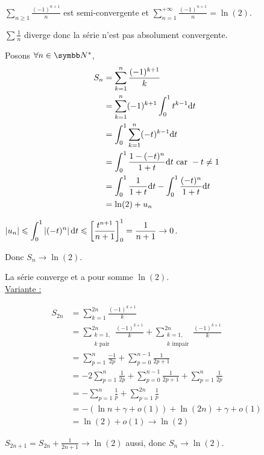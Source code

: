\begin{exemple}
    $\displaystyle \sum_{n \geqslant 1 } \frac{(-1)^{n + 1}} n $ est semi-convergente et $\displaystyle \sum_{n = 1 }^{+ \infty} \frac{(-1)^{n + 1}} n = \ln(2)$.

    $\sum \frac 1 n$ diverge donc la série n'est pas absolument convergente. 

    Posons $\forall n \in \N^*$,
    \begin{align*}
        S_n & = \sum_{k = 1}^{n} \frac{(-1)^{k + 1}} k \\
        & = \sum_{k = 1 }^{n } (-1)^{k + 1} \int_0^1 t^{k - 1} \text d t \\
        & = \int_0^1 \sum_{k = 1 }^{n } (-t)^{k - 1} \text d t \\
        & = \int_0^1 \frac{1 - (-t)^n}{1 + t} \text d t \text{ car } -t \neq 1\\
        & = \int_0^1 \frac 1 {1 + t} \text d t - \int_0^1 \frac{(-t)^n}{1 + t} \text d t \\
        & = \ln(2) + u_n
    \end{align*}

    $\displaystyle \left|u_n\right| \leqslant \int_0^1 \left|(-t)^n\right| \text d t \leqslant \left[ \frac{t^{n + 1 }}{n + 1} \right]_0^1 = \frac 1 {n + 1} \to 0$.

    Donc $S_n \to \ln(2)$.

    La série converge et a pour somme $\ln(2)$. \\

    \uline{Variante :}

    {\allowdisplaybreaks
    \begin{align*}
        S_{2n} & = \sum_{k = 1}^{2n} \frac{(-1)^{k + 1}} k \\
                & = \sum_{\substack {k = 1, \\ k \text{ pair}}}^{2n} \frac {(-1)^{k + 1}} k + \sum_{\substack{k = 1, \\ k \text{ impair}}}^{2n} \frac {(-1)^{k + 1}} k \\
                & = \sum_{p = 1}^{n} \frac{-1}{2p} + \sum_{p = 0}^{n - 1} \frac{1}{2p + 1} \\
                & = -2 \sum_{p = 1 }^{n } \frac 1 {2p} + \sum_{p = 0}^{n - 1} \frac 1 {2 p + 1} + \sum_{p = 1}^{n} \frac 1 {2p} \\
                & = - \sum_{p = 1 }^{n } \frac 1 p + \sum_{p = 1}^{2n} \frac 1 p \\
                & = - (\ln n + \gamma + o (1)) + \ln (2n) + \gamma + o(1) \\
                & = \ln(2) + o(1) \longrightarrow \ln(2)
    \end{align*}
    }

    $S_{2n + 1} = S_{2n} + \frac{1}{2n + 1} \longrightarrow \ln(2)$ aussi, donc $S_n \longrightarrow \ln(2)$.
\end{exemple}

